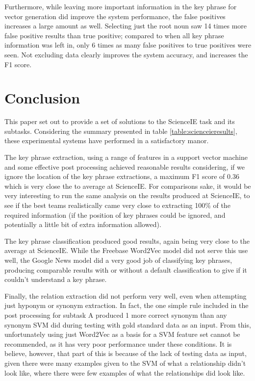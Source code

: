 Furthermore, while leaving more important information in the key phrase for vector generation did improve the system performance, the false positives increases a large amount as well. Selecting just the root noun saw 14 times more false positive results than true positive; compared to when all key phrase information was left in, only 6 times as many false positives to true positives were seen. Not excluding data clearly improves the system accuracy, and increases the F1 score.

\section{Conclusion}
This paper set out to provide a set of solutions to the ScienceIE task and its subtasks. Considering the summary presented in table \ref{table:scienceieresults}, these experimental systems have performed in a satisfactory manor. 

The key phrase extraction, using a range of features in a support vector machine and some effective post processing achieved reasonable results considering, if we ignore the location of the key phrase extractions, a maximum F1 score of 0.36 which is very close the to average at ScienceIE. For comparisons sake, it would be very interesting to run the same analysis on the results produced at ScienceIE, to see if the best teams realistically came very close to extracting 100\% of the required information (if the position of key phrases could be ignored, and potentially a little bit of extra information allowed).

The key phrase classification produced good results, again being very close to the average at ScienceIE. While the Freebase Word2Vec model did not serve this use well, the Google News model did a very good job of classifying key phrases, producing comparable results with or without a default classification to give if it couldn't understand a key phrase. 

Finally, the relation extraction did not perform very well, even when attempting just hyponym or synonym extraction. In fact, the one simple rule included in the post processing for subtask A produced 1 more correct synonym than any synonym SVM did during testing with gold standard data as an input. From this, unfortunately using just Word2Vec as a basis for a SVM feature set cannot be recommended, as it has very poor performance under these conditions. It is believe, however, that part of this is because of the lack of testing data as input, given there were many examples given to the SVM of what a relationship didn't look like, where there were few examples of what the relationships did look like.


